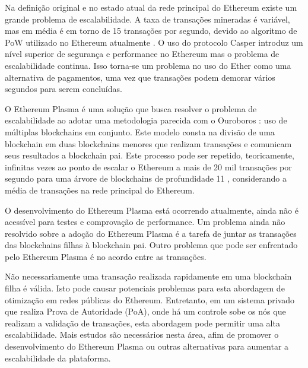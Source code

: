 \documentclass[tcc,capa]{texufpel}
\begin{document}
    Na definição original e no estado atual da rede principal do Ethereum existe um grande problema de escalabilidade. A taxa de transações mineradas é variável, mas em média é em torno de 15 transações por segundo, devido ao algoritmo de PoW utilizado no Ethereum atualmente \cite{bach2018comparative}. O uso do protocolo Casper introduz um nível superior de segurança e performance no Ethereum mas o problema de escalabilidade continua. Isso torna-se um problema no uso do Ether como uma alternativa de pagamentos, uma vez que transações podem demorar vários segundos para serem concluídas.
    
    O Ethereum Plasma é uma solução que busca resolver o problema de escalabilidade ao adotar uma metodologia parecida com o Ouroboros \cite{kiayias2017ouroboros}: uso de múltiplas blockchains em conjunto. Este modelo consta na divisão de uma blockchain em duas blockchains menores que realizam transações e comunicam seus resultados a blockchain pai. Este processo pode ser repetido, teoricamente, infinitas vezes ao ponto de escalar o Ethereum a mais de 20 mil transações por segundo para uma árvore de blockchains de profundidade 11 \cite{poon2017plasma}, considerando a média de transações na rede principal do Ethereum.
    
    O desenvolvimento do Ethereum Plasma está ocorrendo atualmente, ainda não é acessível para testes e comprovação de performance. Um problema ainda não resolvido sobre a adoção do Ethereum Plasma é a tarefa de juntar as transações das blockchains filhas à blockchain pai. Outro problema que pode ser enfrentado pelo Ethereum Plasma é no acordo entre as transações.
    
    Não necessariamente uma transação realizada rapidamente em uma blockchain filha é válida. Isto pode causar potenciais problemas para esta abordagem de otimização em redes públicas do Ethereum. Entretanto, em um sistema privado que realiza Prova de Autoridade (PoA), onde há um controle sobe os nós que realizam a validação de transações, esta abordagem pode permitir uma alta escalabilidade. Mais estudos são necessários nesta área, afim de promover o desenvolvimento do Ethereum Plasma ou outras alternativas para aumentar a escalabilidade da plataforma.

    
    
\end{document}

